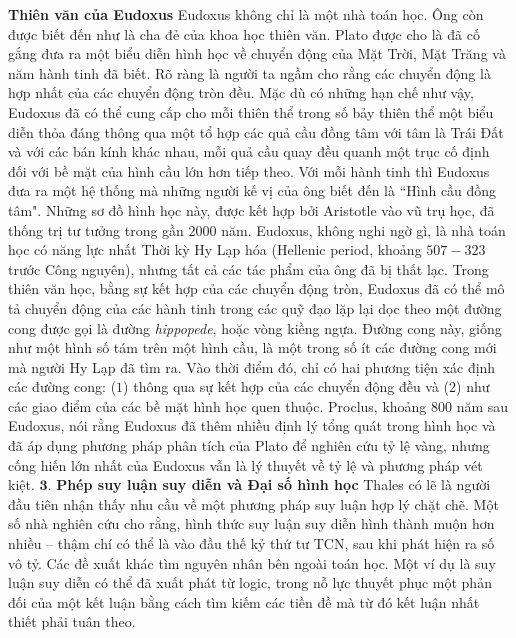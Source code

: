 \begin{multicols}{2}
\begin{figure}[H]
		\vspace*{-15pt}
	\end{figure}
	\textbf{\color{lichsutoanhoc}Thiên văn của Eudoxus} 
	\vskip 0.1cm
	Eudoxus không chỉ là một nhà toán học. Ông còn được biết đến như là cha đẻ của khoa học thiên văn. Plato được cho là đã cố gắng đưa ra một biểu diễn hình học về chuyển động của Mặt Trời, Mặt Trăng và năm hành tinh đã biết. Rõ ràng là người ta ngầm cho rằng các chuyển động là hợp nhất của các chuyển động tròn đều. Mặc dù có những hạn chế như vậy, Eudoxus đã có thể cung cấp cho mỗi thiên thể trong số bảy thiên thể một biểu diễn thỏa đáng thông qua một tổ hợp các quả cầu đồng tâm với tâm là Trái Đất và với các bán kính khác nhau, mỗi quả cầu quay đều quanh một trục cố định đối với bề mặt của hình cầu lớn hơn tiếp theo. Với mỗi hành tinh thì Eudoxus đưa ra một hệ thống mà những người kế vị của ông biết đến là ``Hình cầu đồng tâm". Những sơ đồ hình học này, được kết hợp bởi Aristotle vào vũ trụ học, đã thống trị tư tưởng trong gần $2000$ năm.
	\vskip 0.1cm
	Eudoxus, không nghi ngờ gì, là nhà toán học có năng lực nhất Thời kỳ Hy Lạp hóa (Hellenic period, khoảng $507 - 323$ trước Công nguyên), nhưng tất cả các tác phẩm của ông đã bị thất lạc. Trong thiên văn học, bằng sự kết hợp của các chuyển động tròn, Eudoxus đã có thể mô tả chuyển động của các hành tinh trong các quỹ đạo lặp lại dọc theo một đường cong được gọi là đường {\em hippopede}, hoặc vòng kiềng ngựa. Đường cong này, giống như một hình số tám trên một hình cầu, là một trong số ít các đường cong mới mà người Hy Lạp đã tìm ra. Vào thời điểm đó, chỉ có hai phương tiện xác định các đường cong: ($1$) thông qua sự kết hợp của các chuyển động đều và ($2$) như các giao điểm của các bề mặt hình học quen thuộc. 
	\vskip 0.1cm
	Proclus, khoảng $800$ năm sau Eudoxus, nói rằng Eudoxus đã thêm nhiều định lý tổng quát trong hình học và đã áp dụng phương pháp phân tích của Plato để nghiên cứu tỷ lệ vàng, nhưng cống hiến lớn nhất của  Eudoxus vẫn là lý thuyết về tỷ lệ và phương pháp vét kiệt.
	\vskip 0.1cm
	$\pmb{3.}$ \textbf{\color{lichsutoanhoc}Phép suy luận suy diễn và Đại số hình học}
	\vskip 0.1cm 
	Thales có lẽ là người đầu tiên nhận thấy nhu cầu về một phương pháp suy luận hợp lý chặt chẽ. Một số nhà nghiên cứu cho rằng, hình thức suy luận suy diễn hình thành muộn hơn nhiều -- thậm chí có thể là vào đầu thế kỷ thứ tư TCN, sau khi phát hiện ra số vô tỷ. 
	\vskip 0.1cm
	Các đề xuất khác tìm nguyên nhân bên ngoài toán học. Một ví dụ là suy luận suy diễn có thể đã xuất phát từ logic, trong nỗ lực thuyết phục một phản đối của một kết luận bằng cách tìm kiếm các tiền đề mà từ đó kết luận nhất thiết phải tuân theo.

\end{multicols}
